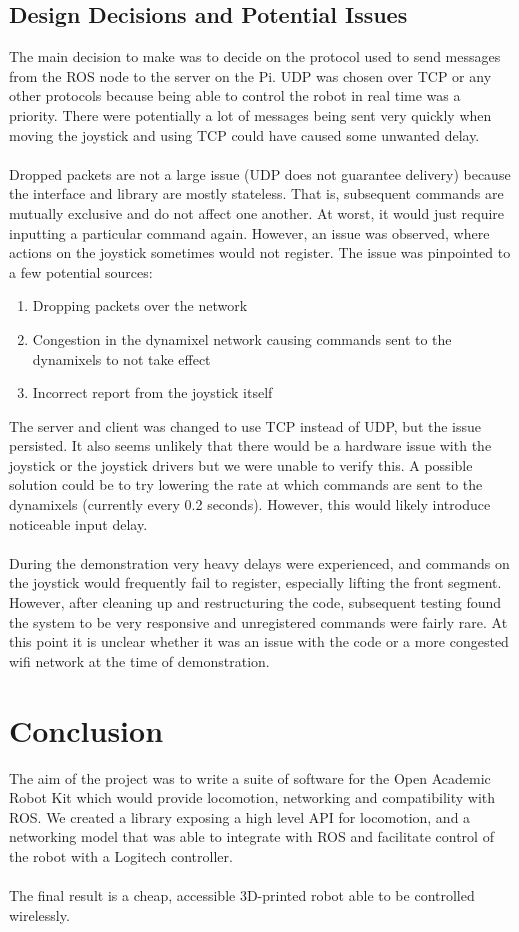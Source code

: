 \documentclass[]{article}
\begin{document}
\subsection{Design Decisions and Potential Issues}
The main decision to make was to decide on the protocol used to send messages from the ROS node to the server on the Pi. UDP was chosen over TCP or any other protocols because being able to control the robot in real time was a priority. There were potentially a lot of messages being sent very quickly when moving the joystick and using TCP could have caused some unwanted delay.
\\
\\
Dropped packets are not a large issue (UDP does not guarantee delivery) because the interface and library are mostly stateless. That is, subsequent commands are mutually exclusive and do not affect one another. At worst, it would just require inputting a particular command again. However, an issue was observed, where actions on the joystick sometimes would not register. The issue was pinpointed to a few potential sources:
\begin{enumerate}
  \item Dropping packets over the network
  \item Congestion in the dynamixel network causing commands sent to the dynamixels to not take effect
  \item Incorrect report from the joystick itself
\end{enumerate}
The server and client was changed to use TCP instead of UDP, but the issue persisted. It also seems unlikely that there would be a hardware issue with the joystick or the joystick drivers but we were unable to verify this. A possible solution could be to try lowering the rate at which commands are sent to the dynamixels (currently every 0.2 seconds). However, this would likely introduce noticeable input delay.
\\
\\
During the demonstration very heavy delays were experienced, and commands on the joystick would frequently fail to register, especially lifting the front segment. However, after cleaning up and restructuring the code, subsequent testing found the system to be very responsive and unregistered commands were fairly rare. At this point it is unclear whether it was an issue with the code or a more congested wifi network at the time of demonstration.

\section{Conclusion}
The aim of the project was to write a suite of software for the Open Academic Robot Kit which would provide locomotion, networking and compatibility with ROS. We created a library exposing a high level API for locomotion, and a networking model that was able to integrate with ROS and facilitate control of the robot with a Logitech controller.
\\
\\
The final result is a cheap, accessible 3D-printed robot able to be controlled wirelessly.
\end{document}
